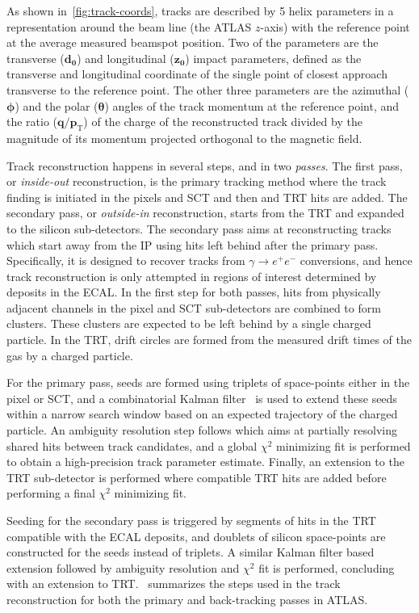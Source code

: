 As shown in~\cref{fig:track-coords}, tracks are described by 5 helix parameters in a representation around the beam line (the ATLAS $z$-axis) with the reference point at the average measured beamspot position. Two of the parameters are the transverse ($\boldsymbol{d_0}$) and longitudinal ($\boldsymbol{z_0}$) impact parameters, defined as the transverse and longitudinal coordinate of the single point of closest approach transverse to the reference point. The other three parameters are the azimuthal ($\boldsymbol{\phi}$) and the polar ($\boldsymbol{\theta}$) angles of the track momentum at the reference point, and the ratio ($\boldsymbol{q/p_\mathrm{T}}$) of the charge of the reconstructed track divided by the magnitude of its momentum projected orthogonal to the magnetic field.

Track reconstruction happens in several steps, and in two \textit{passes}. The first pass, or \textit{inside-out} reconstruction, is the primary tracking method where the track finding is initiated in the pixels and SCT and then and TRT hits are added. The secondary pass, or \textit{outside-in} reconstruction, starts from the TRT and expanded to the silicon sub-detectors. The secondary pass aims at reconstructing tracks which start away from the IP using hits left behind after the primary pass. Specifically, it is designed to recover tracks from $\gamma \to e^+e^-$ conversions, and hence track reconstruction is only attempted in regions of interest determined by deposits in the ECAL. In the first step for both passes, hits from physically adjacent channels in the pixel and SCT sub-detectors are combined to form clusters. These clusters are expected to be left behind by a single charged particle. In the TRT, drift circles are formed from the measured drift times of the gas by a charged particle. 

For the primary pass, seeds are formed using triplets of space-points either in the pixel or SCT, and a combinatorial Kalman filter~\cite{FRUHWIRTH1987444} is used to extend these seeds within a narrow search window based on an expected trajectory of the charged particle. An ambiguity resolution step follows which aims at partially resolving shared hits between track candidates, and a global $\chi^2$ minimizing fit is performed to obtain a high-precision track parameter estimate. Finally, an extension to the TRT sub-detector is performed where compatible TRT hits are added before performing a final $\chi^2$ minimizing fit.

Seeding for the secondary pass is triggered by segments of hits in the TRT compatible with the ECAL deposits, and doublets of silicon space-points are constructed for the seeds instead of triplets. A similar Kalman filter based extension followed by ambiguity resolution and $\chi^2$ fit is performed, concluding with an extension to TRT.~ summarizes the steps used in the track reconstruction for both the primary and back-tracking passes in ATLAS.

